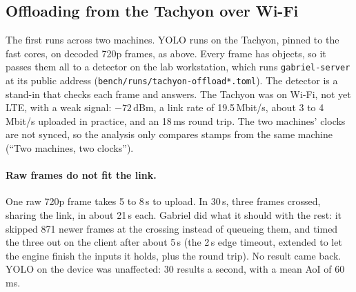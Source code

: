\documentclass[11pt]{article}
\newcommand{\code}[1]{\texttt{#1}}
\begin{document}
\subsection{Offloading from the Tachyon over Wi-Fi}

The first runs across two machines. YOLO runs on the Tachyon, pinned to the
fast cores, on decoded 720p frames, as above. Every frame has objects, so it
passes them all to a detector on the lab workstation, which runs
\code{gabriel-server} at its public address
(\code{bench/runs/tachyon-offload*.toml}). The detector is a stand-in that
checks each frame and answers. The Tachyon was on Wi-Fi, not yet LTE, with a
weak signal: $-72$\,dBm, a link rate of 19.5\,Mbit/s, about 3 to 4\,Mbit/s
uploaded in practice, and an 18\,ms round trip. The two machines' clocks are
not synced, so the analysis only compares stamps from the same machine
(``Two machines, two clocks'').

\paragraph{Raw frames do not fit the link.} One raw 720p frame takes 5 to 8\,s
to upload. In 30\,s, three frames crossed, sharing the link, in about 21\,s
each. Gabriel did what it should with the rest: it skipped 871 newer frames at
the crossing instead of queueing them, and timed the three out on the client
after about 5\,s (the 2\,s edge timeout, extended to let the engine finish the
inputs it holds, plus the round trip). No result came back. YOLO on the device
was unaffected: 30 results a second, with a mean AoI of 60\,ms.
\end{document}
